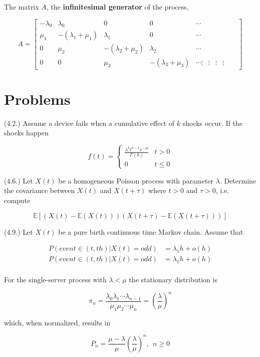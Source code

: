 \documentclass[12pt]{article}
\theoremstyle{nonumberbreak}
\begin{document}
The matrix $A$, the \textbf{infinitesimal generator} of the process,

$$
A = \begin{bmatrix}
-\lambda_0 & \lambda_0 & 0 & 0 & \cdots \\
\mu_1 & -(\lambda_1 + \mu_1)  & \lambda_1 & 0 & \cdots \\
0 & \mu_2 & -(\lambda_2 + \mu_2) & \lambda_2 & \cdots \\
0 & 0 & \mu_3 & -(\lambda_3 + \mu_3) & \cdots
\vdots & \vdots &  \vdots &  \vdots &   & 
\end{bmatrix}
$$


\section{Problems}

(4.2.) Assume a device fails when a cumulative effect of $k$ shocks occur. If the shocks happen 

$$
f(t) = \begin{cases}
\frac{\lambda^k t^{k-1} e^{-\lambda t}}{\Gamma(k)} & t>0 \\[8pt]
0 & t \le 0
\end{cases}
$$


(4.6.) Let $X(t)$ be a homogeneous Poisson process with parameter $\lambda$. Determine the covariance between $X(t)$ and $X(t + \tau)$ where $t > 0$ and $\tau > 0$, i.e. compute

$$
\mathbb{E} \left[ \left( X(t) - \mathbb{E}(X(t)) \right) \left( X(t+\tau) - \mathbb{E}(X(t+\tau)) \right) \right]
$$



(4.9.) Let $X(t)$ be a pure birth continuous time Markov chain. Assume that 

$$
\begin{aligned}
P(event \in (t, th) | X(t) = odd) &= \lambda_1 h + o(h) \\[8pt]
P(event \in (t, th) | X(t) = odd) &= \lambda_1 h + o(h) \\[8pt]
\end{aligned}
$$


For the single-server process with $\lambda < \mu$ the stationary distribution is 

$$
\pi_n = \frac{\lambda_0 \lambda_1 \cdots \lambda_{n-1} }{\mu_1 \mu_2 \cdots \mu_n} = (\frac{\lambda}{\mu})^n
$$

which, when normalized, results in

$$
P_n = \frac{\mu - \lambda}{\mu} (\frac{\lambda}{\mu})^n, \ \ n \ge 0
$$
\end{document}
